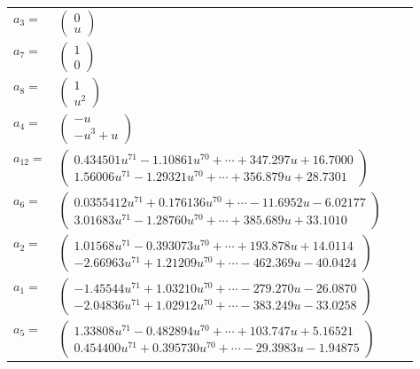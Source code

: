 \documentclass[1p]{elsarticle_modified}
\theoremstyle{definition}
\begin{document}
\begin{tabular}{m{7pt} m{180pt} m{7pt} m{180pt} }
\flushright $a_{3}=$&$\begin{pmatrix}0\\u\end{pmatrix}$ \\
\flushright $a_{7}=$&$\begin{pmatrix}1\\0\end{pmatrix}$ \\
\flushright $a_{8}=$&$\begin{pmatrix}1\\u^2\end{pmatrix}$ \\
\flushright $a_{4}=$&$\begin{pmatrix}- u\\- u^3+u\end{pmatrix}$ \\
\flushright $a_{12}=$&$\begin{pmatrix}0.434501 u^{71}-1.10861 u^{70}+\cdots+347.297 u+16.7000\\1.56006 u^{71}-1.29321 u^{70}+\cdots+356.879 u+28.7301\end{pmatrix}$ \\
\flushright $a_{6}=$&$\begin{pmatrix}0.0355412 u^{71}+0.176136 u^{70}+\cdots-11.6952 u-6.02177\\3.01683 u^{71}-1.28760 u^{70}+\cdots+385.689 u+33.1010\end{pmatrix}$ \\
\flushright $a_{2}=$&$\begin{pmatrix}1.01568 u^{71}-0.393073 u^{70}+\cdots+193.878 u+14.0114\\-2.66963 u^{71}+1.21209 u^{70}+\cdots-462.369 u-40.0424\end{pmatrix}$ \\
\flushright $a_{1}=$&$\begin{pmatrix}-1.45544 u^{71}+1.03210 u^{70}+\cdots-279.270 u-26.0870\\-2.04836 u^{71}+1.02912 u^{70}+\cdots-383.249 u-33.0258\end{pmatrix}$ \\
\flushright $a_{5}=$&$\begin{pmatrix}1.33808 u^{71}-0.482894 u^{70}+\cdots+103.747 u+5.16521\\0.454400 u^{71}+0.395730 u^{70}+\cdots-29.3983 u-1.94875\end{pmatrix}$ \\

\end{tabular}
\end{document}
